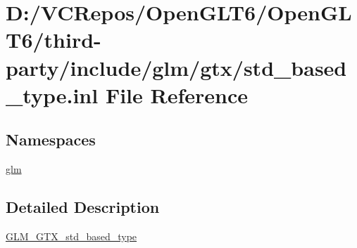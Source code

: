\hypertarget{std__based__type_8inl}{}\section{D\+:/\+V\+C\+Repos/\+Open\+G\+L\+T6/\+Open\+G\+L\+T6/third-\/party/include/glm/gtx/std\+\_\+based\+\_\+type.inl File Reference}
\label{std__based__type_8inl}
\subsection*{Namespaces}
\begin{DoxyCompactItemize}
\item 
 \mbox{\hyperlink{namespaceglm}{glm}}
\end{DoxyCompactItemize}


\subsection{Detailed Description}
\mbox{\hyperlink{group__gtx__std__based__type}{G\+L\+M\+\_\+\+G\+T\+X\+\_\+std\+\_\+based\+\_\+type}} 